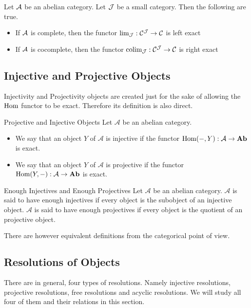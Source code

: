 \documentclass[a4paper]{article}
\begin{document}
\begin{thm}{}{} Let $\mathcal{A}$ be an abelian category. Let $\mathcal{J}$ be a small category. Then the following are true. 
\begin{itemize}
\item If $\mathcal{A}$ is complete, then the functor $\lim_{\mathcal{J}}:\mathcal{C}^{\mathcal{J}}\to\mathcal{C}$ is left exact
\item If $\mathcal{A}$ is cocomplete, then the functor $\operatorname*{colim}_{\mathcal{J}}:\mathcal{C}^{\mathcal{J}}\to\mathcal{C}$ is right exact
\end{itemize}
\end{thm}

\subsection{Injective and Projective Objects}
Injectivity and Projectivity objects are created just for the sake of allowing the $\operatorname{Hom}$ functor to be exact. Therefore its definition is also direct. 

\begin{defn}{Projective and Injective Objects}{} Let $\mathcal{A}$ be an abelian category. 
\begin{itemize}
\item We say that an object $Y$ of $\mathcal{A}$ is injective if the functor $\operatorname{Hom}(-,Y):\mathcal{A}\to\bold{Ab}$ is exact. 
\item We say that an object $Y$ of $\mathcal{A}$ is projective if the functor $\operatorname{Hom}(Y,-):\mathcal{A}\to\bold{Ab}$ is exact. 
\end{itemize}
\end{defn}

\begin{defn}{Enough Injectives and Enough Projectives}{} Let $\mathcal{A}$ be an abelian category. $\mathcal{A}$ is said to have enough injectives if every object is the subobject of an injective object. $\mathcal{A}$ is said to have enough projectives if every object is the quotient of an projective object. 
\end{defn}

There are however equivalent definitions from the categorical point of view. 

\subsection{Resolutions of Objects}
There are in general, four types of resolutions. Namely injective resolutions, projective resolutions, free resolutions and acyclic resolutions. We will study all four of them and their relations in this section. 
\end{document}
